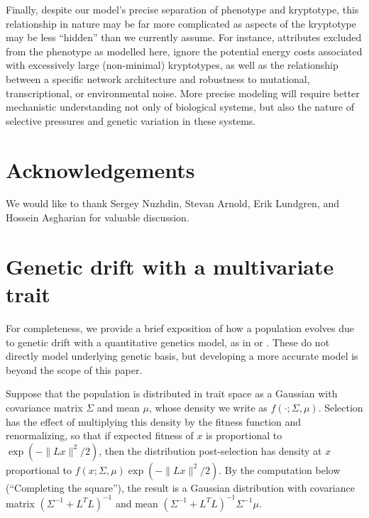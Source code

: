 \documentclass{article}
\newcommand{\plr}[1]{\todo[color=blue!25]{#1}}
\newcommand{\plr}[1]{{\color{blue}\it #1}}
\newcommand{\1}{\mathbbm{1}}
\begin{document}
Finally, despite our model's precise separation of phenotype and kryptotype, this relationship in nature may be far more complicated as aspects of the kryptotype may be less ``hidden'' than we currently assume. For instance, attributes excluded from the phenotype as modelled here, ignore the potential energy costs associated with excessively large (non-minimal) kryptotypes, as well as the relationship between a specific network architecture and robustness to mutational, transcriptional, or environmental noise.
More precise modeling will require better mechanistic understanding not only of biological systems,
but also the nature of selective pressures
and genetic variation in these systems.

%

\section*{Acknowledgements}
We would like to thank Sergey Nuzhdin, Stevan Arnold, Erik Lundgren, and Hossein Asgharian for valuable discussion.
%




\normalsize
\appendix


\section{Genetic drift with a multivariate trait}
\label{ss:quant_gen}

For completeness, we provide a brief exposition of how a population 
evolves due to genetic drift
with a quantitative genetics model,
as in \citet{lande1981models} or \citet{hansen1996translating}.
These do not directly model underlying genetic basis,
but developing a more accurate model is beyond the scope of this paper.

Suppose that the population is distributed in trait space
as a Gaussian with covariance matrix $\Sigma$ and mean $\mu$,
whose density we write as $f(\cdot;\Sigma,\mu)$.
Selection has the effect of multiplying this density by the fitness function and renormalizing,
so that if expected fitness of $x$ is proportional to $\exp(-\|Lx\|^2/2)$,
then the distribution post-selection
has density at $x$ proportional to $f(x;\Sigma,\mu) \exp(-\|Lx\|^2/2)$.
By the computation below (``Completing the square''),
the result is a Gaussian distribution
with covariance matrix $(\Sigma^{-1} + L^T L)^{-1}$ 
and mean $(\Sigma^{-1}+L^T L)^{-1} \Sigma^{-1} \mu$.
\end{document}
